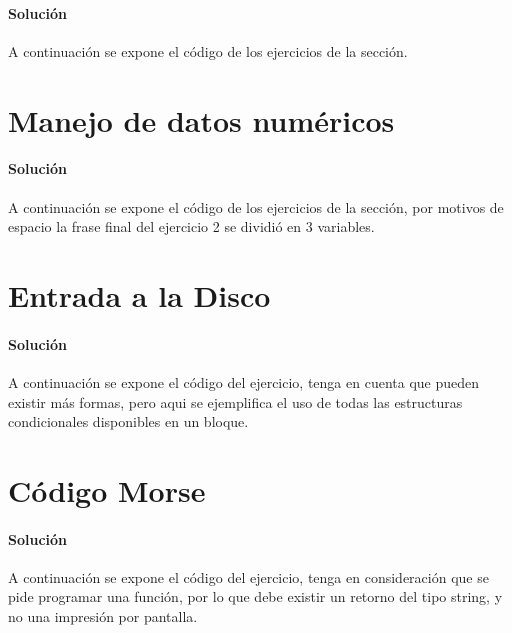 \documentclass[spanish, fleqn]{scrartcl}
\begin{document}
  \paragraph{Solución}
  A continuación se expone el código de los ejercicios de la sección.
  
    
\section{Manejo de datos numéricos}

    \paragraph{Solución}
    A continuación se expone el código de los ejercicios de la sección, por motivos de espacio la frase final del ejercicio 2 se dividió en 3 variables.
    
    

\section{Entrada a la Disco}

    \paragraph{Solución}
    A continuación se expone el código del ejercicio, tenga en cuenta que pueden existir más formas, pero aqui se ejemplifica el uso de todas las estructuras condicionales disponibles en un bloque.
    
    
    
\section{Código Morse}

    \paragraph{Solución}
    A continuación se expone el código del ejercicio, tenga en consideración que se pide programar una función, por lo que debe existir un retorno del tipo string, y no una impresión por pantalla.
    
    
    
\end{document}
